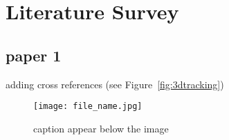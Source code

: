 \chapter{Literature Survey}


\section{paper 1}
adding cross references (see Figure~\ref{fig:3dtracking}) 

\begin{figure}[ht!]
\centering
\texttt{[image: file\_name.jpg]}
\caption[caption in LOF]{caption appear below the image}
\label{fig:reflabel}
\end{figure}

